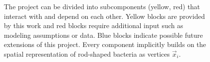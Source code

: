 \documentclass{article}
\begin{document}

\begin{figure}[H]
    \centering
    
    \caption{
        The project can be divided into subcomponents (yellow, red) that interact with and depend on
        each other.
        Yellow blocks are provided by this work and red blocks require additional input such as
        modeling assumptions or data.
        Blue blocks indicate possible future extensions of this project.
        Every component implicitly builds on the spatial representation of rod-shaped bacteria as
        vertices $\vec{x}_i$.
    }
    \label{fig:flowchart-project-structure}
\end{figure}
\end{document}
